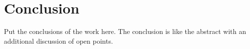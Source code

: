 \documentclass[10pt,        %
               a4paper,     %
               journal,     %
               ]{IEEEtran}
\begin{document}
\section{Conclusion}
Put the conclusions of the work here. The conclusion is like the abstract with
an additional discussion of open points.


%





\end{document}
